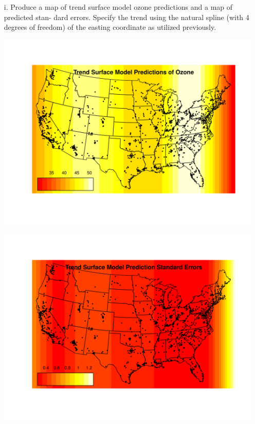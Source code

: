\documentclass[letterpaper, 12pt]{article}\usepackage[]{graphicx}\usepackage[]{color}
\makeatletter
\def\maxwidth{ %
  \ifdim\Gin@nat@width>\linewidth
    \linewidth
  \else
    \Gin@nat@width
  \fi
}
\newenvironment{knitrout}{}{} %
\makeatother
\begin{document}
\begin{enumerate}
\begin{knitrout}
\end{knitrout}


\item[i.]
Produce a map of trend surface model ozone predictions and a map of predicted stan- dard errors. Specify the trend using the natural spline (with 4 degrees of freedom) of the easting coordinate as utilized previously.

\begin{knitrout}
\color{fgcolor}
\includegraphics[width=\maxwidth]{figure/ts} 

\end{knitrout}


\begin{knitrout}
\color{fgcolor}
\includegraphics[width=\maxwidth]{figure/tsresid} 


\end{knitrout}
\end{enumerate}
\end{document}
